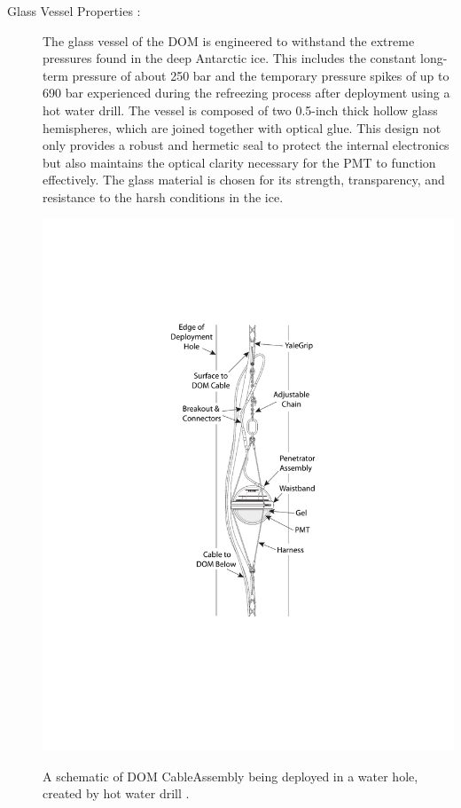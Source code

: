 \begin{description}

    \item[Glass Vessel Properties :] The glass vessel of the DOM is engineered to withstand the extreme pressures found in the deep Antarctic ice. This includes the constant long-term pressure of about 250 bar and the temporary pressure spikes of up to 690 bar experienced during the refreezing process after deployment using a hot water drill. The vessel is composed of two 0.5-inch thick hollow glass hemispheres, which are joined together with optical glue. This design not only provides a robust and hermetic seal to protect the internal electronics but also maintains the optical clarity necessary for the PMT to function effectively. The glass material is chosen for its strength, transparency, and resistance to the harsh conditions in the ice.

    \begin{marginfigure}
        \includegraphics{./figures/nu_in_icecube/domfig2a-CableAssembly.pdf}
        \caption[A schematic of DOM Cable Assembly]{A schematic of DOM CableAssembly being deployed in a water hole, created by hot water drill \cite{Aartsen_2017}.}
    \end{marginfigure}
    

\end{description}
